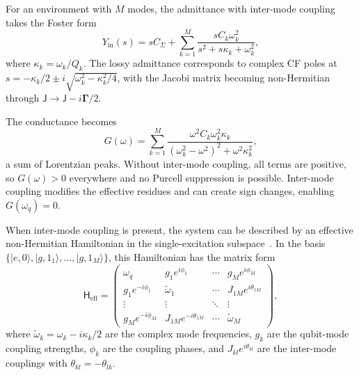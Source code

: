 \documentclass[reprint, floatfix, superscriptaddress, amsmath, amssymb, longbibliography]{revtex4-2}
\newcommand{\Yin}{Y_{\mathrm{in}}}
\begin{document}
For an environment with $M$ modes, the admittance with inter-mode coupling takes the Foster form
\begin{equation}
\Yin(s) = sC_\Sigma + \sum_{k=1}^{M} \frac{s C_k \omega_k^2}{s^2 + s\kappa_k + \omega_k^2},
\label{eq:Yin_multimode_lossy}
\end{equation}
where $\kappa_k = \omega_k/Q_k$. The lossy admittance corresponds to complex CF poles at $s = -\kappa_k/2 \pm i\sqrt{\omega_k^2 - \kappa_k^2/4}$, with the Jacobi matrix becoming non-Hermitian through $\mathsf{J} \to \mathsf{J} - i\boldsymbol{\Gamma}/2$.

The conductance becomes
\begin{equation}
G(\omega) = \sum_{k=1}^{M} \frac{\omega^2 C_k \omega_k^2 \kappa_k}{(\omega_k^2 - \omega^2)^2 + \omega^2\kappa_k^2},
\label{eq:G_multimode}
\end{equation}
a sum of Lorentzian peaks. Without inter-mode coupling, all terms are positive, so $G(\omega) > 0$ everywhere and no Purcell suppression is possible. Inter-mode coupling modifies the effective residues and can create sign changes, enabling $G(\omega_q) = 0$.

When inter-mode coupling is present, the system can be described by an effective non-Hermitian Hamiltonian in the single-excitation subspace~\cite{BakrPurcell2025}. In the basis $\{|e,0\rangle, |g,1_1\rangle, \ldots, |g,1_M\rangle\}$, this Hamiltonian has the matrix form
\begin{equation}
\mathsf{H}_{\mathrm{eff}} = 
\begin{pmatrix}
\omega_q & g_1 e^{i\phi_1} & \cdots & g_M e^{i\phi_M} \\
g_1 e^{-i\phi_1} & \tilde{\omega}_1 & \cdots & J_{1M} e^{i\theta_{1M}} \\
\vdots & \vdots & \ddots & \vdots \\
g_M e^{-i\phi_M} & J_{1M} e^{-i\theta_{1M}} & \cdots & \tilde{\omega}_M
\end{pmatrix},
\label{eq:H_eff_matrix}
\end{equation}
where $\tilde{\omega}_k = \omega_k - i\kappa_k/2$ are the complex mode frequencies, $g_k$ are the qubit-mode coupling strengths, $\phi_k$ are the coupling phases, and $J_{kl}e^{i\theta_{kl}}$ are the inter-mode couplings with $\theta_{kl} = -\theta_{lk}$.
\end{document}
